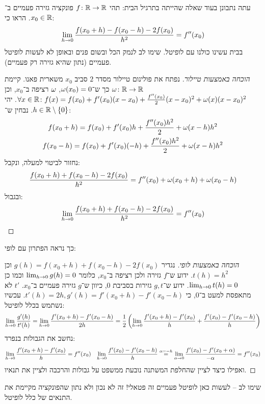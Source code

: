 \documentclass[name=רשימות חשבון דיפרנציאלי ואינטגרלי 1א]{../../../tex/classes/megasumPreamble}
\begin{document}
	עתה נתבונן בעוד שאלה שהייתה בתרגיל הבית: תהי $f \colon \mathbb{R} \to \mathbb{R}$ פונקציה גזירה פעמיים ב־$x_0 \in \mathbb{R}$. הראו כי:
	\[ \lim_{h \to 0} \frac{f(x_0 + h) - f(x_0 - h) - 2f(x_0)}{h^{2}} = f''(x_0) \]
	בבית עשינו כולנו עם לופיטל. שימו לב לנמק הכל ובשום פנים ובאופן לא לעשות לופיטל פעמיים (נתון שהיא גזירה רק פעמיים).
	\begin{proof}[הוכחה באמצעות טיילור]
		נפתח את פולינום טיילור מסדר $2$ סביב $x_0$ משארית פאנו. קיימת $\omega \colon \mathbb{R} \to \mathbb{R}$ כך ש־$\omega(x_0) = 0$, $\omega$ רציפה ב־$x_0$, וכן $\forall x \in \mathbb{R}\colon f(x) = f(x_0) + f'(x_0)(x - x_0) + \frac{f''(x_0)}{2}(x - x_0)^{2} + \omega(x)(x - x_0)^{2}$. יהי $h \in \mathbb{R}\setminus \{0\}$. נבחין ש־:
		\begin{gather*}
			f(x_0 + h) = f(x_0) + f'(x_0)h + \frac{f''(x_0)h^{2}}{2} + \omega(x - h)h^{2} \\
			f(x_0 - h) = f(x_0) + f'(x_0)(-h) + \frac{f''(x_0)h^{2}}{2} + \omega(x - h)h^{2}
		\end{gather*}
		נחזור לביטוי למעלה, ונקבל:
		\[ \frac{f(x_0 + h) + f(x_0  - h) - 2f(x_0)}{h^{2}} = f''(x_0) + \omega(x_0 + h) + \omega(x_0 - h) \]
		ובגבול:
		\[ \lim_{h \to 0} \frac{f(x_0 + h) + f(x_0  - h) - 2f(x_0)}{h^{2}} = f''(x_0) \]
	\end{proof}

	כך נראה הפתרון עם לופי:
	\begin{proof}[הוכחה באמצעות לופי]
		נגדיר $g(h) = f(x_0 + h) + f(x_0  - h) - 2f(x_0)$ וכן $t(h) = h^{2}$. ידוע ש־$f$ גזירה ולכן רציפה ב־$x_0$, כלומר $\lim_{h \to 0} g(h) = 0$ וכמו כן $\lim_{h \to 0} t(h) = 0$. ידוע ש־$g, t$ גזירות בסביבת $0$, כיוון ש־$g$ גזירה פעמיים ב־$x_0$. $t'$ לא מתאפסת למעט ב־$0$, כי $t'(h) = 2h, g'(h) = f'(x_0 + h) - f'(x_0 -h)$. עכשיו נשתמש בכלל לופיטל:
		\begin{gather*}
			\lim_{h \to 0} \frac{g'(h)}{t'(h)} = \lim_{h \to 0} \frac{f'(x_0 + h) - f'(x_0 - h)}{2h} = \frac{1}{2}\left ( \lim_{h \to 0} \frac{f'(x_0 + h) - f'(x_0)}{h} + \frac{f'(x_0) - f'(x_0 - h)}{h} \right )
		\end{gather*}
		נחשב את הגבולות בנפרד:
		\begin{align*}
			\lim_{h \to 0} \frac{f'(x_0 + h) - f'(x_0)}{h} = f''(x_0) && \lim_{h \to 0} \frac{f'(x_0) - f'(x_0 - h)}{h} \overset{\alpha = -h}{=} \lim_{\alpha \to 0}\frac{f'(x_0) - f'(x_0 + \alpha)}{-\alpha} = f''(x_0)
		\end{align*}
		ואפילו כיצד לציין שהחלפת המשתנה נובעת ממשפט על גבולות והרכבה ולציין את תנאיו.
	\end{proof}
	שימו לב – לעשות כאן לופיטל פעמיים זה פטאלי! זה לא נכון ולא נתון שהפונקציה מקיימת את התנאים של כלל לופיטל.
\end{document}
